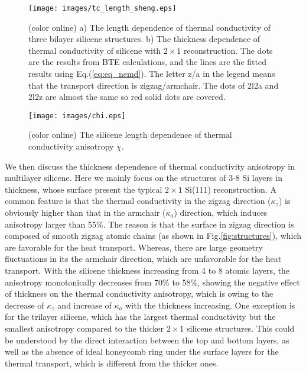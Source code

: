 \documentclass[aps,prb,twocolumn,showpacs,amsmath,amssymb]{revtex4-1}
\begin{document}
\begin{figure}[b]
  \texttt{[image: images/tc\_length\_sheng.eps]}
  \caption{\label{fig:tc_length_sheng} (color online) a) The length dependence of thermal conductivity of three bilayer silicene structures. b) The thickness dependence of thermal conductivity of silicene with $2\times 1$ reconstruction. The dots are the results from BTE calculations, and the lines are the fitted results using Eq.(\ref{eq:eq_nemd}). The letter z/a in the legend means that the transport direction is zigzag/armchair. The dots of 2l2a and 2l2z are almost the same so red solid dots are covered. }
\end{figure}

\begin{figure}[b]
  \texttt{[image: images/chi.eps]}{}
  \caption{\label{fig:chi} (color online) The silicene length dependence of thermal conductivity anisotropy $\chi$.}
\end{figure}

We then discuss the thickness dependence of thermal conductivity anisotropy in multilayer silicene. Here we mainly focus on the structures of 3-8 Si layers in thickness, whose surface present the typical $2 \times 1$ Si(111) reconstruction. A common feature is that the thermal conductivity in the zigzag direction ($\kappa_z$) is obviously higher than that  in the armchair ($\kappa_a$) direction, which induces anisotropy larger than 55\%.
The reason is that the surface in zigzag direction is composed of smooth zigzag atomic chains (as shown in Fig.\ref{fig:structures}), which are favorable for the heat transport. Whereas,  there are large geometry fluctuations in its the armchair direction, which are unfavorable for the heat transport.
With the silicene thickness increasing from 4 to 8 atomic layers, the anisotropy monotonically decreases from 70\% to 58\%, showing the negative  effect of thickness on the thermal conductivity anisotropy, which  is owing to the decrease of $\kappa_z$ and increase of $\kappa_a$  with the  thickness increasing.
One exception is for the trilayer silicene, which has the largest thermal conductivity but the smallest  anisotropy compared to the thicker  $2\times1$ silicene structures.  This could be understood by the direct interaction between the top and bottom layers, as well as the absence of ideal honeycomb ring under the surface layers  for the thermal transport, which is different from the thicker ones\cite{Guo2015Structural}.
\end{document}
